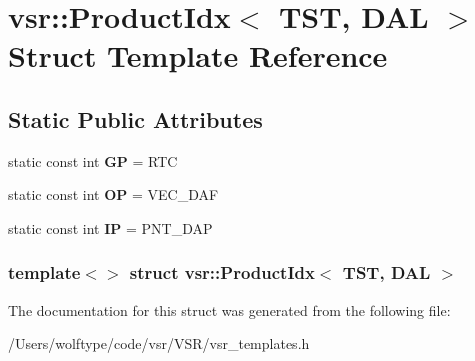\hypertarget{structvsr_1_1_product_idx_3_01_t_s_t_00_01_d_a_l_01_4}{\section{vsr\-:\-:Product\-Idx$<$ T\-S\-T, D\-A\-L $>$ Struct Template Reference}
\label{structvsr_1_1_product_idx_3_01_t_s_t_00_01_d_a_l_01_4}
}
\subsection*{Static Public Attributes}
\begin{DoxyCompactItemize}
\item 
\hypertarget{structvsr_1_1_product_idx_3_01_t_s_t_00_01_d_a_l_01_4_a6abdf333492b213d883601e5d1d15472}{static const int {\bfseries G\-P} = R\-T\-C}\label{structvsr_1_1_product_idx_3_01_t_s_t_00_01_d_a_l_01_4_a6abdf333492b213d883601e5d1d15472}

\item 
\hypertarget{structvsr_1_1_product_idx_3_01_t_s_t_00_01_d_a_l_01_4_a3dab2885b5073b5c06aedf7947f43dbb}{static const int {\bfseries O\-P} = V\-E\-C\-\_\-\-D\-A\-F}\label{structvsr_1_1_product_idx_3_01_t_s_t_00_01_d_a_l_01_4_a3dab2885b5073b5c06aedf7947f43dbb}

\item 
\hypertarget{structvsr_1_1_product_idx_3_01_t_s_t_00_01_d_a_l_01_4_aeddc4b008a1cc41e19b988ee9504ede2}{static const int {\bfseries I\-P} = P\-N\-T\-\_\-\-D\-A\-P}\label{structvsr_1_1_product_idx_3_01_t_s_t_00_01_d_a_l_01_4_aeddc4b008a1cc41e19b988ee9504ede2}

\end{DoxyCompactItemize}
\subsubsection*{template$<$$>$ struct vsr\-::\-Product\-Idx$<$ T\-S\-T, D\-A\-L $>$}



The documentation for this struct was generated from the following file\-:\begin{DoxyCompactItemize}
\item 
/\-Users/wolftype/code/vsr/\-V\-S\-R/vsr\-\_\-templates.\-h\end{DoxyCompactItemize}
